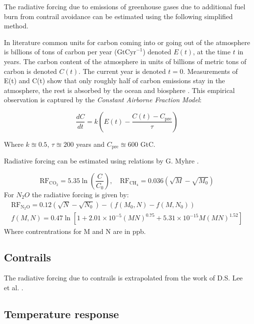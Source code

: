 \documentclass{article}
\begin{document}
The radiative forcing due to emissions of greenhouse gases due to additional fuel burn from contrail avoidance can be estimated using the following simplified method.

In literature common units for carbon coming into or going out of the atmosphere is billions of tons of carbon per year ($\text{GtCyr}^{-1}$)
denoted $E(t)$, at the time $t$ in years. The carbon content of the atmosphere in units of billions of metric tons of carbon is denoted $C(t)$.
The current year is denoted $t=0$.
Measurements of E(t) and C(t) show that only roughly half of carbon emissions stay in the atmosphere, the rest is absorbed by the ocean and biosphere \cite{co2_modelling}.
This empirical observation is captured by the \emph{Constant Airborne Fraction Model}:

\begin{equation}
    \frac{dC}{dt} = k \left( E(t) - \frac{C(t)-C_\text{pre}}{\tau}\right)
\end{equation}

Where $k \approxeq 0.5$, $\tau \approxeq 200 $ years and $C_\text{pre} \approxeq 600$ GtC.

Radiative forcing can be estimated using relations by G. Myhre \cite{rf_greenhouse}.

\begin{equation}
    \text{RF}_{\text{CO}_2} = 5.35 \ln \left( \frac{C}{C_0} \right), \quad \text{RF}_{\text{CH}_4} = 0.036 \left( \sqrt{M}-\sqrt{M_0} \right)
\end{equation}
For $N_2O$ the radiative forcing is given by:
\begin{eqnarray}
    \text{RF}_{\text{N}_2\text{O}} = 0.12(\sqrt{N} - \sqrt{N_0}) - (f(M_0,N) - f(M,N_0)) \\
    f(M, N) = 0.47 \ln\left[1 + 2.01 \times 10^{-5} (MN)^{0.75} + 5.31 \times 10^{-15} M (MN)^{1.52}\right]
\end{eqnarray}
Where contrentrations for M and N are in ppb.

\subsection{Contrails}

The radiative forcing due to contrails is extrapolated from the work of D.S. Lee et al. \cite{contrail_radiative_forcing}.

\subsection{Temperature response}
\end{document}
